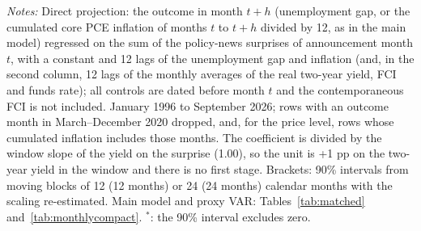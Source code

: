 \begin{table}[tp]\centering\footnotesize\setlength{\tabcolsep}{3pt}
\caption{A Direct Projection on the Policy Surprise}\label{tab:direct}
\begin{flushleft}\footnotesize\textit{Notes:} Direct projection: the outcome in month $t+h$ (unemployment gap, or the cumulated core PCE inflation of months $t$ to $t+h$ divided by 12, as in the main model) regressed on the sum of the policy-news surprises of announcement month $t$, with a constant and 12 lags of the unemployment gap and inflation (and, in the second column, 12 lags of the monthly averages of the real two-year yield, FCI and funds rate); all controls are dated before month $t$ and the contemporaneous FCI is not included. January 1996 to September 2026; rows with an outcome month in March--December 2020 dropped, and, for the price level, rows whose cumulated inflation includes those months. The coefficient is divided by the window slope of the yield on the surprise (1.00), so the unit is +1 pp on the two-year yield in the window and there is no first stage. Brackets: 90\% intervals from moving blocks of 12 (12 months) or 24 (24 months) calendar months with the scaling re-estimated. Main model and proxy VAR: Tables~\ref{tab:matched} and~\ref{tab:monthlycompact}. $^{*}$: the 90\% interval excludes zero.\end{flushleft}
\end{table}
